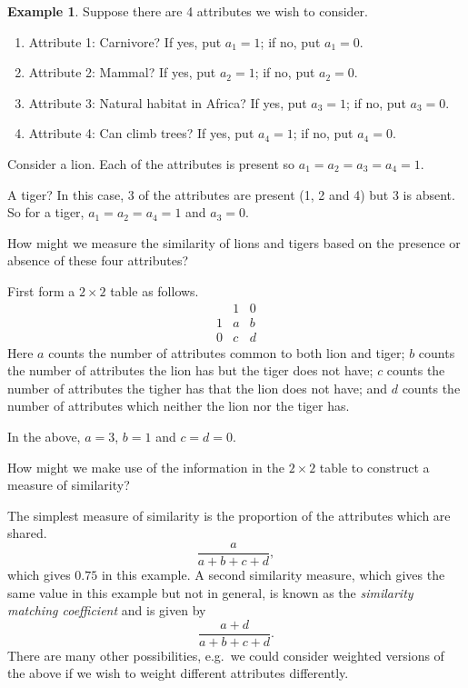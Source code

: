 \documentclass[]{book}
\providecommand{\tightlist}{%
  \setlength{\itemsep}{0pt}\setlength{\parskip}{0pt}}
\theoremstyle{definition}
\theoremstyle{definition}
\newtheorem{example}{Example}[chapter]
\theoremstyle{definition}
\theoremstyle{remark}
\begin{document}
\begin{example}
\protect\hypertarget{exm:unnamed-chunk-2}{}{\label{exm:unnamed-chunk-2} }Suppose there are 4 attributes we wish to consider.

\begin{enumerate}
\def\labelenumi{\arabic{enumi}.}
\tightlist
\item
  Attribute 1: Carnivore? If yes, put \(a_1=1\); if no, put \(a_1=0\).
\item
  Attribute 2: Mammal? If yes, put \(a_2=1\); if no, put \(a_2=0\).
\item
  Attribute 3: Natural habitat in Africa? If yes, put \(a_3=1\); if no, put \(a_3=0\).
\item
  Attribute 4: Can climb trees? If yes, put \(a_4=1\); if no, put \(a_4=0\).
\end{enumerate}

Consider a lion. Each of the attributes is present so \(a_1=a_2=a_3=a_4=1\).

A tiger? In this case, 3 of the attributes are present (1, 2 and 4) but 3 is absent.
So for a tiger, \(a_1=a_2=a_4=1\) and \(a_3=0\).

How might we measure the similarity of lions and tigers based on the presence or absence of these four attributes?

First form a \(2 \times 2\) table as follows.
\[
\begin{array}{cccc}
 &1 &0\\
1& a & b\\
0& c & d
\end{array}
\]
Here \(a\) counts the number of attributes common to both lion and tiger; \(b\) counts the number of attributes the lion has but the tiger does not have; \(c\) counts the number of attributes the tigher has that the lion does not have; and \(d\) counts the number of attributes which neither the lion nor the tiger has.

In the above, \(a=3\), \(b=1\) and \(c=d=0\).

How might we make use of the information in the \(2 \times 2\) table to construct a measure of similarity?

The simplest measure of similarity is the proportion of the attributes which are shared.
\[
\frac{a}{a+b+c+d},
\]
which gives \(0.75\) in this example.
A second similarity measure, which gives the same value in this example but not in general, is known as the \emph{similarity matching coefficient} and is given by
\begin{equation}
\frac{a+d}{a+b+c+d}.
\label{eq:smc}
\end{equation}
There are many other possibilities, e.g.~we could consider weighted versions of the above if we wish to weight different attributes differently.
\end{example}
\end{document}
